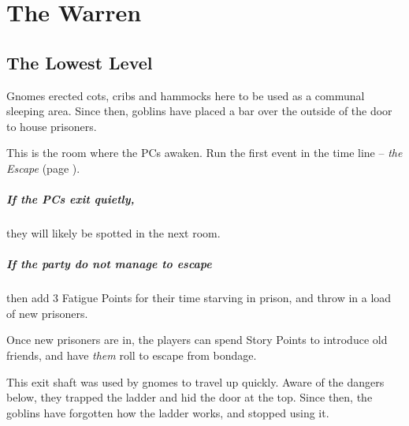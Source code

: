 \chapter{The Warren}

\begin{figure*}[t]
	
\end{figure*}

\section{The Lowest Level}

\begin{multicols}{2}
\setcounter{list}{0}

\label{entrycell}

\begin{exampletext}

	Gnomes erected cots, cribs and hammocks here to be used as a communal sleeping area.
	Since then, goblins have placed a bar over the outside of the door to house prisoners.

\end{exampletext}

This is the room where the PCs awaken.
Run the first event in the time line -- \textit{the Escape} (page \pageref{escape}).

\paragraph{If the PCs exit quietly,}
they will likely be spotted in the next room.

\paragraph{If the party do not manage to escape}
then add 3 Fatigue Points for their time starving in prison, and throw in a load of new prisoners.

Once new prisoners are in, the players can spend Story Points to introduce old friends, and have \textit{them} roll to escape from bondage.


\begin{exampletext}

	This exit shaft was used by gnomes to travel up quickly.
	Aware of the dangers below, they trapped the ladder and hid the door at the top.
	Since then, the goblins have forgotten how the ladder works, and stopped using it.


\end{exampletext}
\end{multicols}
